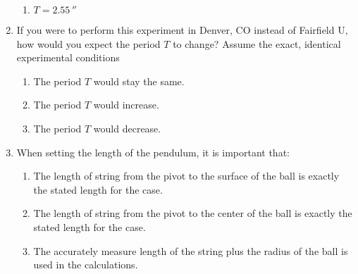 \begin{enumerate}
\begin{enumerate}
  \item $T =  2.55\,\second$
  \end{enumerate}
\item If you were to perform this experiment in Denver, CO instead of Fairfield U, how would you expect the period $T$ to change? Assume the exact, identical experimental conditions
  \begin{enumerate}
  \item The period $T$ would stay the same.
  \item The period $T$ would increase.
  \item The period $T$ would decrease.
  \end{enumerate}
\item When setting the length of the pendulum, it is important that:
  \begin{enumerate}
  \item The length of string from the pivot to the surface of the ball is exactly the stated length for the case.
  \item The length of string from the pivot to the center of the ball is exactly the stated length for the case.
  \item The accurately measure length of the string plus the radius of the ball is used in the calculations.
  \end{enumerate}
\end{enumerate}


